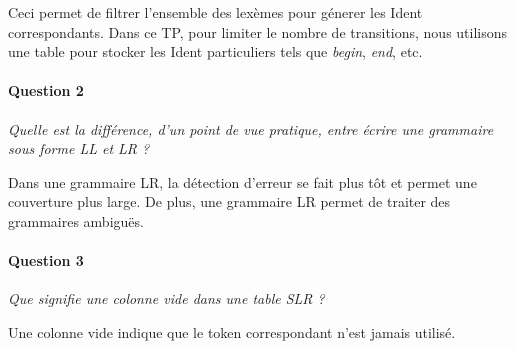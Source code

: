 \documentclass{article}
\begin{document}
Ceci permet de filtrer l'ensemble des lexèmes pour génerer les Ident correspondants. Dans ce TP, pour limiter le nombre de transitions, nous utilisons une table pour stocker les Ident particuliers tels que \emph{begin}, \emph{end}, etc.


\paragraph{Question 2}
\emph{Quelle est la différence, d'un point de vue pratique, entre écrire une grammaire sous forme LL et LR ?}

Dans une grammaire LR, la détection d'erreur se fait plus tôt et permet une couverture plus large. De plus, une grammaire LR permet de traiter des grammaires ambiguës.


\paragraph{Question 3}
\emph{Que signifie une colonne vide dans une table SLR ?}

Une colonne vide indique que le token correspondant n'est jamais utilisé.
\end{document}
